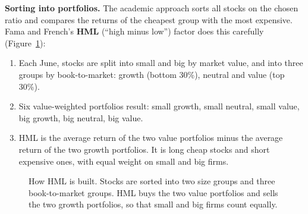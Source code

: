 \textbf{Sorting into portfolios.} The academic approach sorts all stocks on the chosen ratio and compares the returns of the cheapest group with the most expensive. Fama and French's \textbf{HML} (``high minus low'') factor does this carefully (Figure~\ref{fig:08-hml}):

\begin{enumerate}
  \item Each June, stocks are split into small and big by market value, and into three groups by book-to-market: growth (bottom 30\%), neutral and value (top 30\%).
  \item Six value-weighted portfolios result: small growth, small neutral, small value, big growth, big neutral, big value.
  \item HML is the average return of the two value portfolios minus the average return of the two growth portfolios. It is long cheap stocks and short expensive ones, with equal weight on small and big firms.
\end{enumerate}


\begin{figure}[!htbp]
  \centering
\caption{How HML is built. Stocks are sorted into two size groups and three book-to-market groups. HML buys the two value portfolios and sells the two growth portfolios, so that small and big firms count equally.}
\label{fig:08-hml}
\end{figure}

